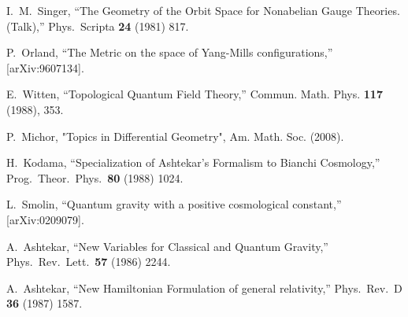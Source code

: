 \documentclass[letterpaper,11pt]{article}
\begin{document}
\begin{thebibliography}{99}
 
  I.~M.~Singer,
  ``The Geometry of the Orbit Space for Nonabelian Gauge Theories. (Talk),''
  Phys.\ Scripta {\bf 24} (1981) 817.


  P.~Orland,
  ``The Metric on the space of Yang-Mills configurations,''
  [arXiv:9607134].









E.~Witten,
``Topological Quantum Field Theory,''
Commun. Math. Phys. \textbf{117} (1988), 353.





P.~Michor, "Topics in Differential Geometry", Am. Math. Soc. (2008).







  H.~Kodama,
  ``Specialization of Ashtekar's Formalism to Bianchi Cosmology,''
  Prog.\ Theor.\ Phys.\  {\bf 80} (1988) 1024.



  L.~Smolin,
  ``Quantum gravity with a positive cosmological constant,''
  [arXiv:0209079].




  A.~Ashtekar,
  ``New Variables for Classical and Quantum Gravity,''
  Phys.\ Rev.\ Lett.\  {\bf 57} (1986) 2244.

  A.~Ashtekar,
  ``New Hamiltonian Formulation of general relativity,''
  Phys.\ Rev.\  D {\bf 36} (1987) 1587.














\end{thebibliography}
\end{document}
